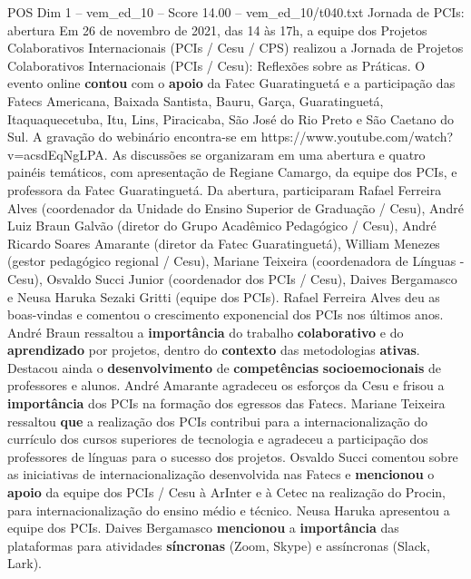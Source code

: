 \begin{textsample}{POS Dim 1 – vem\_ed\_10 – Score 14.00 – vem\_ed\_10/t040.txt}  \label{ex:f1_pos_117}
Jornada de PCIs: abertura Em 26 de novembro de 2021, das 14 às 17h, a equipe dos Projetos Colaborativos Internacionais (PCIs / Cesu / CPS) realizou a Jornada de Projetos Colaborativos Internacionais (PCIs / Cesu): Reflexões sobre as Práticas.
O evento online \textbf{contou} com o \textbf{apoio} da Fatec Guaratinguetá e a participação das Fatecs Americana, Baixada Santista, Bauru, Garça, Guaratinguetá, Itaquaquecetuba, Itu, Lins, Piracicaba, São José do Rio Preto e São Caetano do Sul.
A gravação do webinário encontra-se em https://www.youtube.com/watch?v=acsdEqNgLPA.
As discussões se organizaram em uma abertura e quatro painéis temáticos, com apresentação de Regiane Camargo, da equipe dos PCIs, e professora da Fatec Guaratinguetá.
Da abertura, participaram Rafael Ferreira Alves (coordenador da Unidade do Ensino Superior de Graduação / Cesu), André Luiz Braun Galvão (diretor do Grupo Acadêmico Pedagógico / Cesu), André Ricardo Soares Amarante (diretor da Fatec Guaratinguetá), William Menezes (gestor pedagógico regional / Cesu), Mariane Teixeira (coordenadora de Línguas - Cesu), Osvaldo Succi Junior (coordenador dos PCIs / Cesu), Daives Bergamasco e Neusa Haruka Sezaki Gritti (equipe dos PCIs).
Rafael Ferreira Alves deu as boas-vindas e comentou o crescimento exponencial dos PCIs nos últimos anos.
André Braun ressaltou a \textbf{importância} do trabalho \textbf{colaborativo} e do \textbf{aprendizado} por projetos, dentro do \textbf{contexto} das metodologias \textbf{ativas}.
Destacou ainda o \textbf{desenvolvimento} de \textbf{competências} \textbf{socioemocionais} de professores e alunos.
André Amarante agradeceu os esforços da Cesu e frisou a \textbf{importância} dos PCIs na formação dos egressos das Fatecs.
Mariane Teixeira ressaltou \textbf{que} a realização dos PCIs contribui para a internacionalização do currículo dos cursos superiores de tecnologia e agradeceu a participação dos professores de línguas para o sucesso dos projetos.
Osvaldo Succi comentou sobre as iniciativas de internacionalização desenvolvida nas Fatecs e \textbf{mencionou} o \textbf{apoio} da equipe dos PCIs / Cesu à ArInter e à Cetec na realização do Procin, para internacionalização do ensino médio e técnico.
Neusa Haruka apresentou a equipe dos PCIs.
Daives Bergamasco \textbf{mencionou} a \textbf{importância} das plataformas para atividades \textbf{síncronas} (Zoom, Skype) e assíncronas (Slack, Lark).

\end{textsample}
